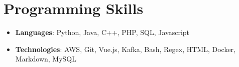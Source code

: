 \documentclass[letterpaper,11pt]{article}
\newcommand{\entryWithKeyword}[2]{
  \item\small{
    \textbf{#1}{: #2 \vspace{-2pt}}
  }
}
\newcommand{\eventListStart}{\begin{itemize}[leftmargin=*]}
\newcommand{\eventListEnd}{\end{itemize}}
\begin{document}
\section{Programming Skills}
 \eventListStart
    \entryWithKeyword{Languages}{Python, Java, C++, PHP, SQL, Javascript}
    \entryWithKeyword{Technologies}{AWS, Git, Vue.js, Kafka, Bash, Regex, HTML, Docker, Markdown, MySQL}
 \eventListEnd


\end{document}
